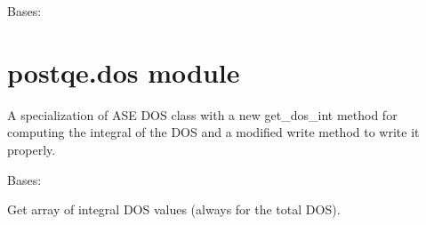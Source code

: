 \documentclass[letterpaper,10pt,english]{sphinxmanual}
\begin{document}
\begin{fulllineitems}
\label{postqe:postqe.eos.QEEquationOfState}
Bases: 

\begin{fulllineitems}
\label{postqe:postqe.eos.QEEquationOfState.write}
\end{fulllineitems}


\end{fulllineitems}


\begin{fulllineitems}
\label{postqe:postqe.eos.create_header}
\end{fulllineitems}



\section{postqe.dos module}
\label{postqe:postqe-dos-module}\label{postqe:module-postqe.dos}
A specialization of ASE DOS class with a new get\_dos\_int method for computing the integral of the DOS
and a modified  write method to write it properly.

\begin{fulllineitems}
\label{postqe:postqe.dos.QEDOS}
Bases: 

\begin{fulllineitems}
\label{postqe:postqe.dos.QEDOS.get_dos_int}
Get array of integral DOS values (always for the total DOS).

\end{fulllineitems}


\begin{fulllineitems}
\label{postqe:postqe.dos.QEDOS.write}
\end{fulllineitems}


\end{fulllineitems}
\end{document}
